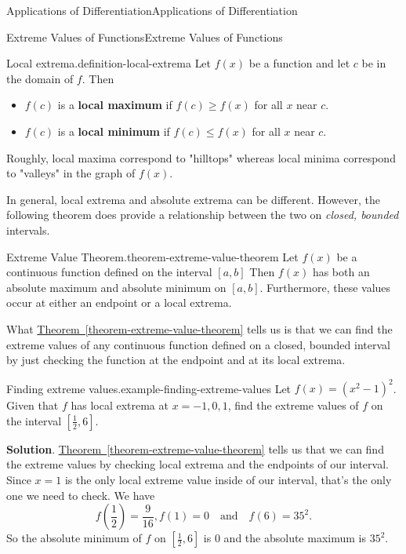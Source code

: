 \documentclass[10pt,]{book}
\newcommand{\terminology}[1]{\textbf{#1}}
\numberwithin{equation}{section}
\begin{document}
\begin{chapterptx}{Applications of Differentiation}{}{Applications of Differentiation}{}{}
\begin{sectionptx}{Extreme Values of Functions}{}{Extreme Values of Functions}{}{}
\begin{definition}{Local extrema.}{definition-local-extrema}
\hypertarget{p-313}{}%
Let \(f(x)\) be a function and let \(c\) be in the domain of \(f\). Then \leavevmode%
\begin{itemize}[label=\textbullet]
\item{}\(f(c)\) is a \terminology{local maximum} if \(f(c)\geq f(x)\) for all \(x\) near \(c\).%
\item{}\(f(c)\) is a \terminology{local minimum} if \(f(c)\leq f(x)\) for all \(x\) near \(c\).%
\end{itemize}
 Roughly, local maxima correspond to "hilltops" whereas local minima correspond to "valleys" in the graph of \(f(x)\).%
\end{definition}
\hypertarget{p-314}{}%
In general, local extrema and absolute extrema can be different. However, the following theorem does provide a relationship between the two on \emph{closed, bounded} intervals.%
\begin{theorem}{Extreme Value Theorem.}{}{theorem-extreme-value-theorem}%
\hypertarget{p-315}{}%
Let \(f(x)\) be a continuous function defined on the interval \([a,b]\) Then \(f(x)\) has both an absolute maximum and absolute minimum on \([a,b]\). Furthermore, these values occur at either an endpoint or a local extrema.%
\end{theorem}
\hypertarget{p-316}{}%
What \hyperref[theorem-extreme-value-theorem]{Theorem~\ref{theorem-extreme-value-theorem}} tells us is that we can find the extreme values of any continuous function defined on a closed, bounded interval by just checking the function at the endpoint and at its local extrema.%
\begin{example}{Finding extreme values.}{example-finding-extreme-values}%
\hypertarget{p-317}{}%
Let \(f(x) = (x^{2}-1)^{2}\). Given that \(f\) has local extrema at \(x=-1,0,1\), find the extreme values of \(f\) on the interval \([\frac{1}{2},6]\).%
\par\smallskip%
\noindent\textbf{Solution}.\hypertarget{solution-70}{}\quad%
\hypertarget{p-318}{}%
\hyperref[theorem-extreme-value-theorem]{Theorem~\ref{theorem-extreme-value-theorem}} tells us that we can find the extreme values by checking local extrema and the endpoints of our interval. Since \(x=1\) is the only local extreme value inside of our interval, that's the only one we need to check. We have%
\begin{equation*}
f(\frac{1}{2}) = \frac{9}{16}, f(1) = 0\quad\text{and}\quad f(6) = 35^{2}.
\end{equation*}
So the absolute minimum of \(f\) on \([\frac{1}{2},6]\) is \(0\) and the absolute maximum is \(35^{2}.\)%

\end{example}
\end{sectionptx}
\end{chapterptx}
\end{document}
